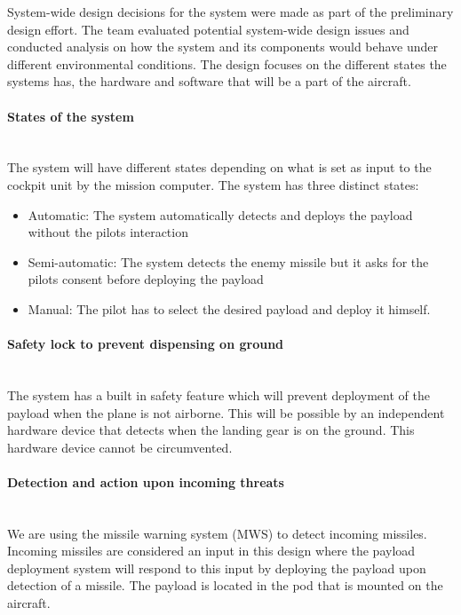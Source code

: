 System-wide design decisions for the system were made as part of the preliminary design effort. The team evaluated potential system-wide design issues and conducted analysis on how the system and its components would behave under different environmental conditions. The design focuses on the different states the systems has, the hardware and software that will be a part of the aircraft.

\paragraph{States of the system} \makebox{} \\
The system will have different states depending on what is set as input to the cockpit unit by the mission computer. The system has three distinct states: 
\begin{itemize}
\item Automatic: The system automatically detects and deploys the payload without the pilots interaction
\item Semi-automatic: The system detects the enemy missile but it asks for the pilots consent before deploying the payload
\item Manual: The pilot has to select the desired payload and deploy it himself.
\end{itemize}


\paragraph{Safety lock to prevent dispensing on ground}  \makebox{} \\
The system has a built in safety feature which will prevent deployment of the payload when the plane is not airborne. This will be possible by an independent hardware device that detects when the landing gear is on the ground. This hardware device cannot be circumvented.

\paragraph{Detection and action upon incoming threats}  \makebox{} \\
We are using the missile warning system (MWS) to detect incoming missiles. Incoming missiles are considered an input in this design where the payload deployment system will respond to this input by deploying the payload upon detection of a missile. The payload is located in the pod that is mounted on the aircraft.


